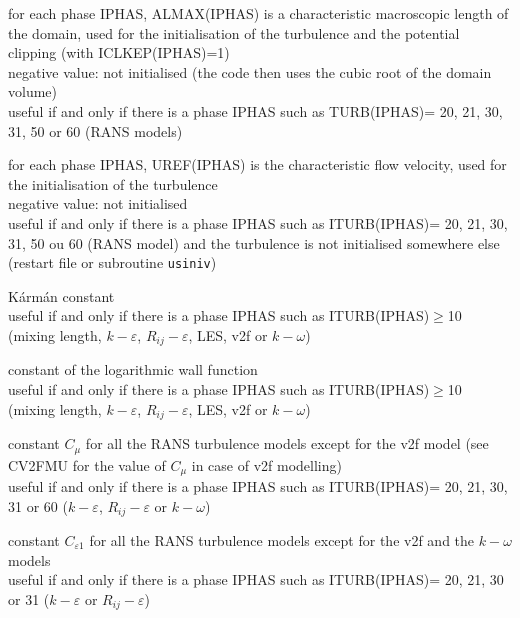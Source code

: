 {for each phase IPHAS, ALMAX(IPHAS) is a characteristic macroscopic
length of the domain, used for the initialisation of the turbulence and
the potential clipping (with ICLKEP(IPHAS)=1)\\ 
negative value: not initialised (the code then uses the cubic root of
the domain volume)\\
useful if and only if there is a phase IPHAS such as 
TURB(IPHAS)= 20, 21, 30, 31, 50 or 60 (RANS models)}

{for each phase IPHAS, UREF(IPHAS) is the characteristic flow velocity,
used for the initialisation of the turbulence\\
negative value: not initialised\\
useful if and only if there is a phase IPHAS such as
ITURB(IPHAS)= 20, 21, 30, 31, 50 ou 60 (RANS model)
and the turbulence is not initialised somewhere
else (restart file or subroutine \texttt{usiniv})}



{K\'arm\'an constant\\
useful if and only if there is a phase IPHAS such as ITURB(IPHAS)$\geqslant$10 
(mixing length, $k-\varepsilon$, $R_{ij}-\varepsilon$, LES, v2f or $k-\omega$)}

{constant of the logarithmic wall function\\ 
useful if and only if there is a phase IPHAS such as ITURB(IPHAS)$\geqslant$10 
(mixing length, $k-\varepsilon$, $R_{ij}-\varepsilon$, LES, v2f or $k-\omega$)}

{constant $C_\mu$ for all the RANS turbulence models except for the v2f model
(see CV2FMU for the value of $C_\mu$ in case of v2f modelling)\\
useful if and only if there is a phase IPHAS such as ITURB(IPHAS)= 20,
21, 30, 31 or 60 ($k-\varepsilon$, $R_{ij}-\varepsilon$ or $k-\omega$)}

{constant $C_{\varepsilon 1}$ for all the RANS turbulence models except
for the v2f and the $k-\omega$ models\\
useful if and only if there is a phase IPHAS such as ITURB(IPHAS)= 20,
21, 30 or 31 ($k-\varepsilon$ or $R_{ij}-\varepsilon$)}

